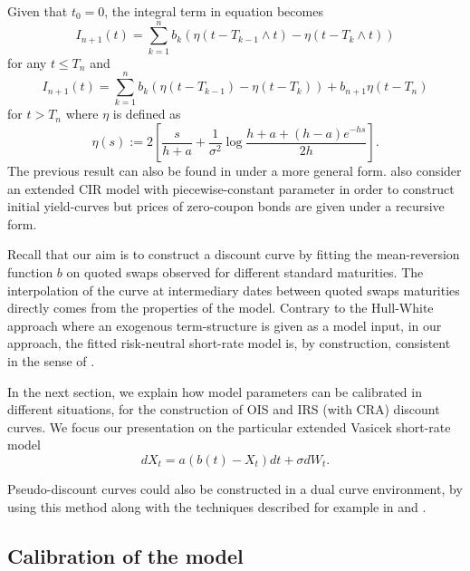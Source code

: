 Given that $t_{0}=0$, the integral term  in equation \label{ZC_price} becomes 
\begin{equation}
\label{Intb}
I_{n+1}(t) = \sum_{k=1}^n b_k \left( \eta(t - T_{k-1} \wedge t) -  \eta(t - T_k \wedge t) \right)
\end{equation}
\medskip
for any $t \leq T_n$ and
\begin{equation}
\label{Intb}
I_{n+1}(t) = \sum_{k=1}^n b_k \left( \eta(t - T_{k-1}) -  \eta(t - T_k ) \right) + b_{n+1} \eta(t - T_n)
\end{equation}
for $t > T_n$ where $\eta$ is defined as
\begin{equation}
\eta(s):= 2\left[\frac{s}{h+a} +  \frac{1}{\sigma^2}\log\frac{h+a+(h-a)e^{-hs}}{2h}\right].
\end{equation}
The previous result can also be found in \cite{Bielecki2014} under a more general form. \cite{Schlogl2000} also consider an extended CIR model with piecewise-constant parameter in order to construct initial yield-curves but prices of zero-coupon bonds  are given under a recursive form.%

\medskip

Recall that our aim is to construct a discount curve by fitting the mean-reversion function $b$ on quoted swaps observed for different standard maturities. The interpolation of the curve at intermediary dates between quoted swaps maturities directly comes from the properties of the model.
Contrary to the Hull-White approach where an exogenous term-structure is given as a model input, in our approach, the fitted risk-neutral short-rate model is, by construction, consistent in the sense of \cite{bjork1999interest}. 

\medskip


In the next section, we explain how model parameters can be calibrated in different situations, for the construction of OIS and IRS (with CRA) discount curves. We focus our presentation on the particular extended Vasicek short-rate model
  \begin{equation}
\label{Vasicek}
dX_t = a(b(t) - X_t)dt + \sigma dW_{t}.
\end{equation}

Pseudo-discount curves could also be constructed in a dual curve environment, by using this method along with the techniques described for example in \cite{ametrano2013everything} and \cite{white2012multiple}. 

\subsection{Calibration of the model}

